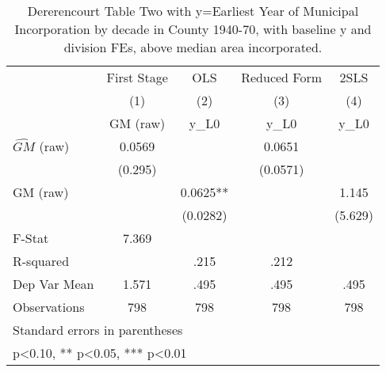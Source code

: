 \begin{table}[htbp]\centering
\def\sym#1{\ifmmode^{#1}\else\(^{#1}\)\fi}
\caption{Dererencourt Table Two with y=Earliest Year of Municipal Incorporation by decade in County 1940-70, with baseline y and division FEs, above median area incorporated.}
\begin{tabular}{l*{4}{c}}
\toprule
                    & First Stage   &         OLS   &Reduced Form   &        2SLS   \\
                    &\multicolumn{1}{c}{(1)}&\multicolumn{1}{c}{(2)}&\multicolumn{1}{c}{(3)}&\multicolumn{1}{c}{(4)}\\
                    &\multicolumn{1}{c}{GM  (raw)}&\multicolumn{1}{c}{y\_L0}&\multicolumn{1}{c}{y\_L0}&\multicolumn{1}{c}{y\_L0}\\
\midrule
$\hat{GM}$ (raw)    &      0.0569   &               &      0.0651   &               \\
                    &     (0.295)   &               &    (0.0571)   &               \\
\addlinespace
GM  (raw)           &               &      0.0625** &               &       1.145   \\
                    &               &    (0.0282)   &               &     (5.629)   \\
\midrule
F-Stat              &       7.369   &               &               &               \\
R-squared           &               &        .215   &        .212   &               \\
Dep Var Mean        &       1.571   &        .495   &        .495   &        .495   \\
Observations        &         798   &         798   &         798   &         798   \\
\bottomrule
\multicolumn{5}{l}{\footnotesize Standard errors in parentheses}\\
\multicolumn{5}{l}{\footnotesize * p<0.10, ** p<0.05, *** p<0.01}\\
\end{tabular}
\end{table}
